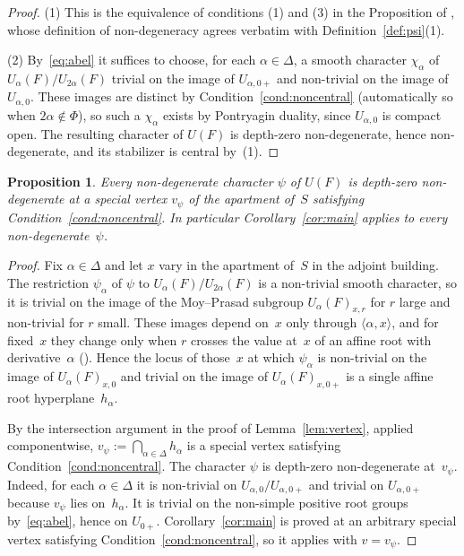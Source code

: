 \documentclass[11pt]{amsart}
\newtheorem{proposition}[theorem]{Proposition}
\theoremstyle{definition}
\theoremstyle{remark}
\begin{document}
\begin{proof}
(1) This is the equivalence of conditions (1) and (3) in the Proposition of \cite[\S 1.2]{BH}, whose definition of non-degeneracy agrees verbatim with Definition~\ref{def:psi}(1).

(2) By~\eqref{eq:abel} it suffices to choose, for each $\alpha \in \Delta$, a smooth character $\chi_\alpha$ of $U_\alpha(F)/U_{2\alpha}(F)$ trivial on the image of $U_{\alpha,0+}$ and non-trivial on the image of $U_{\alpha,0}$. These images are distinct by Condition~\ref{cond:noncentral} (automatically so when $2\alpha\notin\Phi$), so such a $\chi_\alpha$ exists by Pontryagin duality, since $U_{\alpha,0}$ is compact open. The resulting character of $U(F)$ is depth-zero non-degenerate, hence non-degenerate, and its stabilizer is central by~(1).
\end{proof}

\begin{proposition}\label{prop:depthzero}
Every non-degenerate character $\psi$ of $U(F)$ is depth-zero non-degenerate at a special vertex $v_\psi$ of the apartment of~$S$ satisfying Condition~\ref{cond:noncentral}. In particular Corollary~\ref{cor:main} applies to every non-degenerate~$\psi$.
\end{proposition}

\begin{proof}
Fix $\alpha\in\Delta$ and let $x$ vary in the apartment of~$S$ in the adjoint building. The restriction $\psi_\alpha$ of $\psi$ to $U_\alpha(F)/U_{2\alpha}(F)$ is a non-trivial smooth character, so it is trivial on the image of the Moy--Prasad subgroup $U_\alpha(F)_{x,r}$ for $r$ large and non-trivial for $r$ small. These images depend on~$x$ only through $\langle\alpha,x\rangle$, and for fixed~$x$ they change only when $r$ crosses the value at~$x$ of an affine root with derivative~$\alpha$ (\cite[\S 1.6]{Tits}). Hence the locus of those~$x$ at which $\psi_\alpha$ is non-trivial on the image of $U_\alpha(F)_{x,0}$ and trivial on the image of $U_\alpha(F)_{x,0+}$ is a single affine root hyperplane~$h_\alpha$.

By the intersection argument in the proof of Lemma~\ref{lem:vertex}, applied componentwise, $v_\psi := \bigcap_{\alpha\in\Delta}h_\alpha$ is a special vertex satisfying Condition~\ref{cond:noncentral}. The character $\psi$ is depth-zero non-degenerate at~$v_\psi$. Indeed, for each $\alpha\in\Delta$ it is non-trivial on $U_{\alpha,0}/U_{\alpha,0+}$ and trivial on $U_{\alpha,0+}$ because $v_\psi$ lies on~$h_\alpha$. It is trivial on the non-simple positive root groups by~\eqref{eq:abel}, hence on $U_{0+}$. Corollary~\ref{cor:main} is proved at an arbitrary special vertex satisfying Condition~\ref{cond:noncentral}, so it applies with $v = v_\psi$.
\end{proof}
\end{document}
